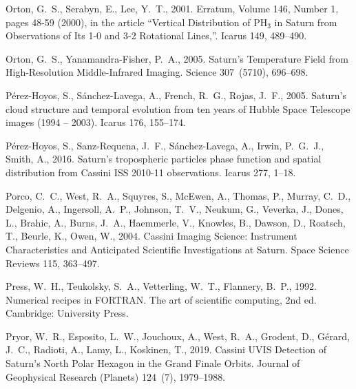 \documentclass[article,11pt]{emulateapj}
\begin{document}
\begin{thebibliography}{85}
{Orton}, G.~S., {Serabyn}, E., {Lee}, Y.~T., 2001. {Erratum, Volume 146, Number
  1, pages 48-59 (2000), in the article ``Vertical Distribution of PH$_{3}$ in
  Saturn from Observations of Its 1-0 and 3-2 Rotational Lines,''}. Icarus 149,
  489--490.

{Orton}, G.~S., {Yanamandra-Fisher}, P.~A., 2005. {Saturn's Temperature Field
  from High-Resolution Middle-Infrared Imaging}. Science 307~(5710), 696--698.

{P{\'e}rez-Hoyos}, S., {S{\'a}nchez-Lavega}, A., {French}, R.~G., {Rojas},
  J.~F., 2005. {Saturn's cloud structure and temporal evolution from ten years
  of Hubble Space Telescope images (1994 -- 2003)}. Icarus 176, 155--174.

{P{\'e}rez-Hoyos}, S., {Sanz-Requena}, J.~F., {S{\'a}nchez-Lavega}, A.,
  {Irwin}, P.~G.~J., {Smith}, A., 2016. {Saturn's tropospheric particles phase
  function and spatial distribution from Cassini ISS 2010-11 observations}.
  Icarus 277, 1--18.

{Porco}, C.~C., {West}, R.~A., {Squyres}, S., {McEwen}, A., {Thomas}, P.,
  {Murray}, C.~D., {Delgenio}, A., {Ingersoll}, A.~P., {Johnson}, T.~V.,
  {Neukum}, G., {Veverka}, J., {Dones}, L., {Brahic}, A., {Burns}, J.~A.,
  {Haemmerle}, V., {Knowles}, B., {Dawson}, D., {Roatsch}, T., {Beurle}, K.,
  {Owen}, W., 2004. {Cassini Imaging Science: Instrument Characteristics and
  Anticipated Scientific Investigations at Saturn}. Space Science Reviews 115,
  363--497.

{Press}, W.~H., {Teukolsky}, S.~A., {Vetterling}, W.~T., {Flannery}, B.~P.,
  1992. {Numerical recipes in FORTRAN. The art of scientific computing, 2nd
  ed.} Cambridge: University Press.

{Pryor}, W.~R., {Esposito}, L.~W., {Jouchoux}, A., {West}, R.~A., {Grodent},
  D., {G{\'e}rard}, J.~C., {Radioti}, A., {Lamy}, L., {Koskinen}, T., 2019.
  {Cassini UVIS Detection of Saturn's North Polar Hexagon in the Grand Finale
  Orbits}. Journal of Geophysical Research (Planets) 124~(7), 1979--1988.


\end{thebibliography}
\end{document}
